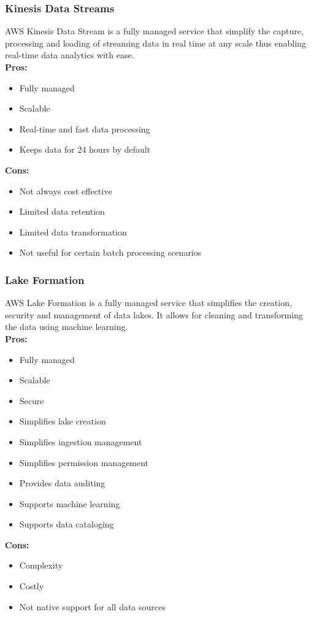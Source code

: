         \subsubsection{Kinesis Data Streams} 
        \label{aws:kinesis-data-streams}
        AWS Kinesis Data Stream is a fully managed service that simplify the capture,
         processing and loading of streaming data in real time at any scale thus enabling real-time data analytics with ease.\\
        \textbf{Pros:}
        \begin{itemize}
            \item Fully managed
            \item Scalable
            \item Real-time and fast data processing
            \item Keeps data for 24 hours by default
        \end{itemize}
        \textbf{Cons:}
        \begin{itemize}
            \item Not always cost effective
            \item Limited data retention
            \item Limited data transformation
            \item Not useful for certain batch processing scenarios
        \end{itemize}

        \subsubsection{Lake Formation}
        \label{aws:lake-formation}
        AWS Lake Formation is a fully managed service that simplifies the creation, security and management of data lakes.
        It allows for cleaning and transforming the data using machine learning.\\
        \textbf{Pros:}
        \begin{itemize}
            \item Fully managed
            \item Scalable
            \item Secure
            \item Simplifies lake creation 
            \item Simplifies ingestion management    
            \item Simplifies permission management      
            \item Provides data auditing 
            \item Supports machine learning
            \item Supports data cataloging
        \end{itemize}
        \textbf{Cons:}
        \begin{itemize}
            \item Complexity
            \item Costly
            \item Not native support for all data sources
        \end{itemize}

